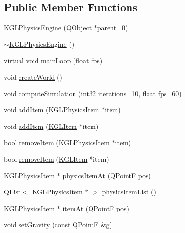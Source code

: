 \subsection*{Public Member Functions}
\begin{CompactItemize}
\item 
\hyperlink{class_k_g_l_physics_engine_0818ba02342badbfbe03053d39b90039}{KGLPhysicsEngine} (QObject $\ast$parent=0)
\item 
\hyperlink{class_k_g_l_physics_engine_98c83543996d5546657cd66dc9f4e4c5}{$\sim$KGLPhysicsEngine} ()
\item 
virtual void \hyperlink{class_k_g_l_physics_engine_b72358d3b45888792d7c4e91715d29b4}{mainLoop} (float fps)
\item 
void \hyperlink{class_k_g_l_physics_engine_009c7c03e8f732078a884c6470fee7aa}{createWorld} ()
\item 
void \hyperlink{class_k_g_l_physics_engine_c93209f7f6e2fd36e088f1d27fb11c96}{computeSimulation} (int32 iterations=10, float fps=60)
\item 
void \hyperlink{class_k_g_l_physics_engine_94a77a670eb52594fa7aa468c3ef9fea}{addItem} (\hyperlink{class_k_g_l_physics_item}{KGLPhysicsItem} $\ast$item)
\item 
void \hyperlink{class_k_g_l_physics_engine_eefe31c558a83c43d1840987cdea1898}{addItem} (\hyperlink{class_k_g_l_item}{KGLItem} $\ast$item)
\item 
bool \hyperlink{class_k_g_l_physics_engine_86b45678b02feaab807db096a260063a}{removeItem} (\hyperlink{class_k_g_l_physics_item}{KGLPhysicsItem} $\ast$item)
\item 
bool \hyperlink{class_k_g_l_physics_engine_c5e88c0ab7ec1923038fdcb36ffdb192}{removeItem} (\hyperlink{class_k_g_l_item}{KGLItem} $\ast$item)
\item 
\hyperlink{class_k_g_l_physics_item}{KGLPhysicsItem} $\ast$ \hyperlink{class_k_g_l_physics_engine_7ee68f8b014f5523f4ab1e9959ea2993}{physicsItemAt} (QPointF pos)
\item 
QList$<$ \hyperlink{class_k_g_l_physics_item}{KGLPhysicsItem} $\ast$ $>$ \hyperlink{class_k_g_l_physics_engine_1024a6769903dc99982546d54fdd4a5e}{physicsItemList} ()
\item 
\hyperlink{class_k_g_l_physics_item}{KGLPhysicsItem} $\ast$ \hyperlink{class_k_g_l_physics_engine_93baa2d72eb792cf7139507186a3d0c4}{itemAt} (QPointF pos)
\item 
void \hyperlink{class_k_g_l_physics_engine_ada02faca27bd54213c1c73af61d0795}{setGravity} (const QPointF \&g)
\end{CompactItemize}


